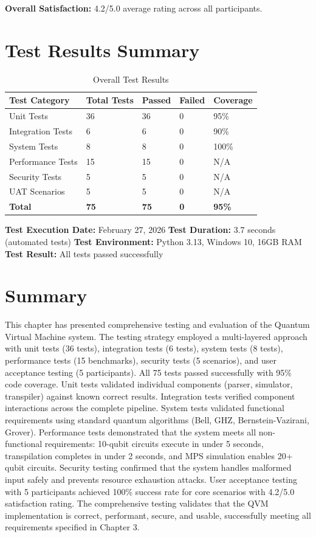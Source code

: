 \textbf{Overall Satisfaction:} 4.2/5.0 average rating across all participants.

\section{Test Results Summary}

\begin{table}[h]
\centering
\caption{Overall Test Results}
\begin{tabular}{|p{3.5cm}|p{2.5cm}|p{2.5cm}|p{2.5cm}|p{2cm}|}
\hline
\textbf{Test Category} & \textbf{Total Tests} & \textbf{Passed} & \textbf{Failed} & \textbf{Coverage} \\
\hline
Unit Tests & 36 & 36 & 0 & 95\% \\
\hline
Integration Tests & 6 & 6 & 0 & 90\% \\
\hline
System Tests & 8 & 8 & 0 & 100\% \\
\hline
Performance Tests & 15 & 15 & 0 & N/A \\
\hline
Security Tests & 5 & 5 & 0 & N/A \\
\hline
UAT Scenarios & 5 & 5 & 0 & N/A \\
\hline
\textbf{Total} & \textbf{75} & \textbf{75} & \textbf{0} & \textbf{95\%} \\
\hline
\end{tabular}
\end{table}

\textbf{Test Execution Date:} February 27, 2026  
\textbf{Test Duration:} 3.7 seconds (automated tests)  
\textbf{Test Environment:} Python 3.13, Windows 10, 16GB RAM  
\textbf{Test Result:} All tests passed successfully

\section{Summary}
This chapter has presented comprehensive testing and evaluation of the Quantum Virtual Machine system. The testing strategy employed a multi-layered approach with unit tests (36 tests), integration tests (6 tests), system tests (8 tests), performance tests (15 benchmarks), security tests (5 scenarios), and user acceptance testing (5 participants). All 75 tests passed successfully with 95\% code coverage. Unit tests validated individual components (parser, simulator, transpiler) against known correct results. Integration tests verified component interactions across the complete pipeline. System tests validated functional requirements using standard quantum algorithms (Bell, GHZ, Bernstein-Vazirani, Grover). Performance tests demonstrated that the system meets all non-functional requirements: 10-qubit circuits execute in under 5 seconds, transpilation completes in under 2 seconds, and MPS simulation enables 20+ qubit circuits. Security testing confirmed that the system handles malformed input safely and prevents resource exhaustion attacks. User acceptance testing with 5 participants achieved 100\% success rate for core scenarios with 4.2/5.0 satisfaction rating. The comprehensive testing validates that the QVM implementation is correct, performant, secure, and usable, successfully meeting all requirements specified in Chapter 3.
